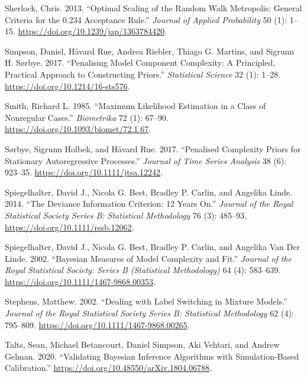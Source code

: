 \documentclass[
  11pt,
  letterpaper,
]{scrbook}
\newlength{\cslhangindent}
\newenvironment{CSLReferences}[2] %
 {\begin{list}{}{%
  \setlength{\itemindent}{0pt}
  \setlength{\leftmargin}{0pt}
  \setlength{\parsep}{0pt}
  \ifodd #1
   \setlength{\leftmargin}{\cslhangindent}
   \setlength{\itemindent}{-1\cslhangindent}
  \fi
  \setlength{\itemsep}{#2\baselineskip}}}
 {\end{list}}
\theoremstyle{plain}
\theoremstyle{plain}
\theoremstyle{plain}
\theoremstyle{definition}
\theoremstyle{definition}
\theoremstyle{definition}
\theoremstyle{remark}
\begin{document}
\begin{CSLReferences}{1}{0}
Sherlock, Chris. 2013. {``Optimal Scaling of the Random Walk
{M}etropolis: General Criteria for the 0.234 Acceptance Rule.''}
\emph{Journal of Applied Probability} 50 (1): 1--15.
\url{https://doi.org/10.1239/jap/1363784420}.

Simpson, Daniel, Håvard Rue, Andrea Riebler, Thiago G. Martins, and
Sigrunn H. Sørbye. 2017. {``Penalising Model Component Complexity: A
Principled, Practical Approach to Constructing Priors.''}
\emph{Statistical Science} 32 (1): 1--28.
\url{https://doi.org/10.1214/16-sts576}.

Smith, Richard L. 1985. {``Maximum Likelihood Estimation in a Class of
Nonregular Cases.''} \emph{Biometrika} 72 (1): 67--90.
\url{https://doi.org/10.1093/biomet/72.1.67}.

Sørbye, Sigrunn Holbek, and Håvard Rue. 2017. {``Penalised Complexity
Priors for Stationary Autoregressive Processes.''} \emph{Journal of Time
Series Analysis} 38 (6): 923--35.
\url{https://doi.org/10.1111/jtsa.12242}.

Spiegelhalter, David J., Nicola G. Best, Bradley P. Carlin, and Angelika
Linde. 2014. {``The Deviance Information Criterion: 12 Years On.''}
\emph{Journal of the Royal Statistical Society Series B: Statistical
Methodology} 76 (3): 485--93. \url{https://doi.org/10.1111/rssb.12062}.

Spiegelhalter, David J., Nicola G. Best, Bradley P. Carlin, and Angelika
Van Der Linde. 2002. {``Bayesian Measures of Model Complexity and
Fit.''} \emph{Journal of the Royal Statistical Society: Series B
(Statistical Methodology)} 64 (4): 583--639.
\url{https://doi.org/10.1111/1467-9868.00353}.

Stephens, Matthew. 2002. {``Dealing with Label Switching in Mixture
Models.''} \emph{Journal of the Royal Statistical Society Series B:
Statistical Methodology} 62 (4): 795--809.
\url{https://doi.org/10.1111/1467-9868.00265}.

Talts, Sean, Michael Betancourt, Daniel Simpson, Aki Vehtari, and Andrew
Gelman. 2020. {``Validating {B}ayesian Inference Algorithms with
Simulation-Based Calibration.''}
\url{https://doi.org/10.48550/arXiv.1804.06788}.


\end{CSLReferences}
\end{document}
